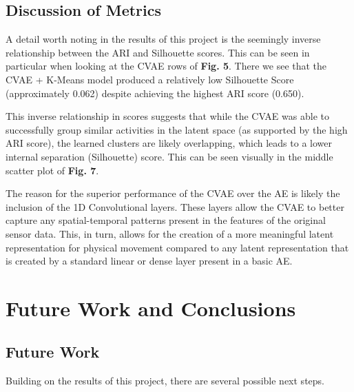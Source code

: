 \documentclass[12pt]{IEEEtran}
\begin{document}
\subsection{Discussion of Metrics}

A detail worth noting in the results of this project is the seemingly inverse relationship between the ARI and Silhouette scores. This can be seen in particular when looking at the CVAE rows of \textbf{Fig. 5}. There we see that the CVAE + K-Means model produced a relatively low Silhouette Score (approximately 0.062) despite achieving the highest ARI score (0.650). 

This inverse relationship in scores suggests that while the CVAE was able to successfully group similar activities in the latent space (as supported by the high ARI score), the learned clusters are likely overlapping, which leads to a lower internal separation (Silhouette) score. This can be seen visually in the middle scatter plot of \textbf{Fig. 7}.

The reason for the superior performance of the CVAE over the AE is likely the inclusion of the 1D Convolutional layers. These layers allow the CVAE to better capture any spatial-temporal patterns present in the features of the original sensor data. This, in turn, allows for the creation of a more meaningful latent representation for physical movement compared to any latent representation that is created by a standard linear or dense layer present in a basic AE.

\section{Future Work and Conclusions}

\subsection{Future Work}
Building on the results of this project, there are several possible next steps. 
\end{document}
